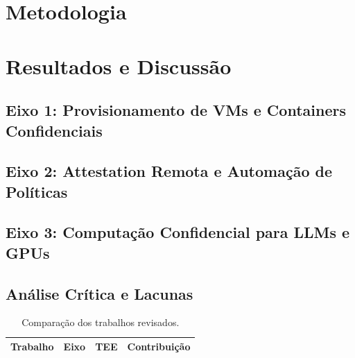 \documentclass[12pt]{article}
\begin{document}
\section{Metodologia}\label{sec:metodologia}

\section{Resultados e Discussão}\label{sec:resultados}

\subsection{Eixo 1: Provisionamento de VMs e Containers Confidenciais}

\subsection{Eixo 2: Attestation Remota e Automação de Políticas}

\subsection{Eixo 3: Computação Confidencial para LLMs e GPUs}

\subsection{Análise Crítica e Lacunas}

\begin{table}[ht]
\centering
\caption{Comparação dos trabalhos revisados.}\label{tab:comparacao}
\begin{tabular}{@{}llll@{}}
\toprule
Trabalho & Eixo & TEE & Contribuição \\
\midrule
\bottomrule
\end{tabular}
\end{table}
\end{document}
